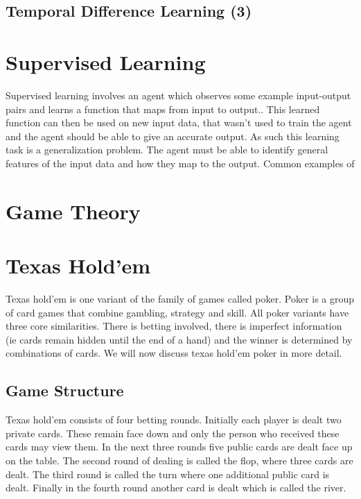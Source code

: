\subsection{Temporal Difference Learning (3)}\label{subsec:td}


\section{Supervised Learning}\label{sec:supervisedLearning}
Supervised learning involves an agent which observes some example input-output pairs and learns
a function that maps from input to output.\citep{russell2016artificial}.
This learned function can then be used on new input data, that wasn't used to train the agent and the
agent should be able to give an accurate output.
As such this learning task is a generalization problem.
The agent must be able to identify general features of the input data and how they map to the output.
Common examples of

\section{Game Theory}\label{sec:gameTheory}

\section{Texas Hold'em}\label{sec:thIntro}
Texas hold'em is one variant of the family of games called poker.
Poker is a group of card games that combine gambling, strategy and skill.
All poker variants have three core similarities.
There is betting involved, there is imperfect information (ie cards remain hidden until the end of a hand)
and the winner is determined by combinations of cards.
We will now discuss texas hold'em poker in more detail.

\subsection{Game Structure}\label{subsec:bettingRounds}
Texas hold'em consists of four betting rounds.
Initially each player is dealt two private cards.
These remain face down and only the person who received these cards may view them.
In the next three rounds five public cards are dealt face up on the table.
The second round of dealing is called the flop, where three cards are dealt.
The third round is called the turn where one additional public card is dealt.
Finally in the fourth round another card is dealt which is called the river.

